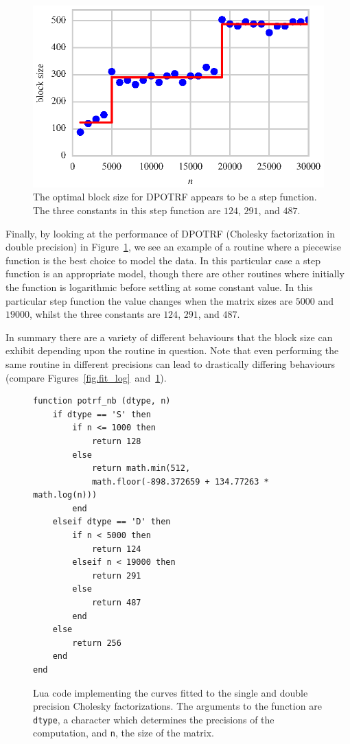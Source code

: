 \documentclass[a4paper,12pt]{article}
\begin{document}
\begin{figure}[ht]
  \centering
  \includegraphics[scale=1]{fig/curvefit_step.eps}
  \caption{The optimal block size for DPOTRF appears to
    be a step function. The three constants in this step function
    are $124$, $291$, and $487$.}
  \label{fig.fit_step}
\end{figure}
Finally,
by looking at the performance of DPOTRF
(Cholesky factorization in double precision)
in Figure~\ref{fig.fit_step},
we see an example of a routine
where a piecewise function is
the best choice to model the data.
In this particular case a step function is
an appropriate model,
though there are other routines where
initially the function is logarithmic before
settling at some constant value.
In this particular step function the value changes
when the matrix sizes are $5000$ and $19000$,
whilst the three constants are $124$, $291$, and $487$.

In summary there are a variety of different behaviours that
the block size can exhibit depending upon the
routine in question.
Note that even performing the same routine in different
precisions can lead to drastically differing behaviours
(compare Figures~\ref{fig.fit_log}~and~\ref{fig.fit_step}).

\begin{figure}[ht]
  \centering
\begin{verbatim}
function potrf_nb (dtype, n)
    if dtype == 'S' then
        if n <= 1000 then
            return 128
        else
            return math.min(512,
            math.floor(-898.372659 + 134.77263 * math.log(n)))
        end
    elseif dtype == 'D' then
        if n < 5000 then
       	    return 124
        elseif n < 19000 then
            return 291
        else
            return 487
        end
    else
        return 256
    end
end
\end{verbatim}
  \caption{Lua code implementing the curves fitted to the single and
    double precision Cholesky factorizations. The arguments to the
    function are \texttt{dtype}, a character which determines the
    precisions of the computation, and \texttt{n}, the size of the matrix.}
  \label{fig.lua_code}
\end{figure}
\end{document}
